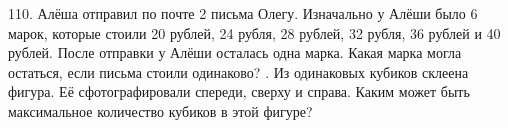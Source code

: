 110. Алёша отправил по почте 2 письма Олегу. Изначально у Алёши было 6 марок, которые стоили 20 рублей, 24 рубля, 28 рублей, 32 рубля, 36 рублей и 40 рублей. После отправки у Алёши осталась одна марка. Какая марка могла остаться, если письма стоили одинаково?
\newpage
{}. Из одинаковых кубиков склеена фигура. Её сфотографировали спереди, сверху и справа. Каким может быть максимальное количество кубиков в этой фигуре?
\begin{center}
\begin{figure}[ht!]
\end{figure}
\end{center}
